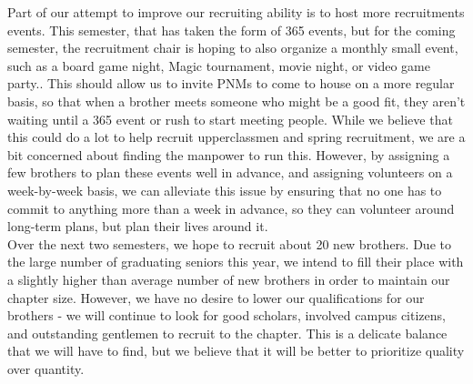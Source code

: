     Part of our attempt to improve our recruiting ability is to host more recruitments events. This semester, that has taken the form of 365 events, but for the coming semester, the recruitment chair is hoping to also organize a monthly small event, such as a board game night, Magic tournament, movie night, or video game party.. This should allow us to invite PNMs to come to house on a more regular basis, so that when a brother meets someone who might be a good fit, they aren’t waiting until a 365 event or rush to start meeting people. While we believe that this could do a lot to help recruit upperclassmen and spring recruitment, we are a bit concerned about finding the manpower to run this. However, by assigning a few brothers to plan these events well in advance, and assigning volunteers on a week-by-week basis, we can alleviate this issue by ensuring that no one has to commit to anything more than a week in advance, so they can volunteer around long-term plans, but plan their lives around it. \\
    
    Over the next two semesters, we hope to recruit about 20 new brothers. Due to the large number of graduating seniors this year, we intend to fill their place with a slightly higher than average number of new brothers in order to maintain our chapter size. However, we have no desire to lower our qualifications for our brothers - we will continue to look for good scholars, involved campus citizens, and outstanding gentlemen to recruit to the chapter. This is a delicate balance that we will have to find, but we believe that it will be better to prioritize quality over quantity.